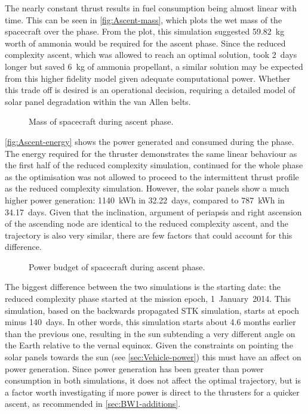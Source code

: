 The nearly constant thrust results in fuel consumption being almost linear with time. This can be seen in \autoref{fig:Ascent-mass}, which plots the wet mass of the spacecraft over the phase. From the plot, this simulation suggested 59.82~kg worth of ammonia would be required for the ascent phase. %
Since the reduced complexity ascent, which was allowed to reach an optimal solution, took 2~days longer but saved 6~kg of ammonia propellant, a similar solution may be expected from this higher fidelity model given adequate computational power. Whether this trade off is desired is an operational decision, requiring a detailed model of solar panel degradation within the van Allen belts.

\begin{figure}
\caption{Mass of spacecraft during ascent phase.} \label{fig:Ascent-mass}
\centering
\def\svgwidth{\figurewidth}

\end{figure}

\autoref{fig:Ascent-energy} shows the power generated and consumed during the phase. The energy required for the thruster demonstrates the same linear behaviour as the first half of the reduced complexity simulation, continued for the whole phase as the optimisation was not allowed to proceed to the intermittent thrust profile as the reduced complexity simulation. However, the solar panels show a much higher power generation: 1140~kWh in 32.22~days, compared to 787~kWh in 34.17~days. Given that the inclination, argument of periapsis and right ascension of the ascending node are identical to the reduced complexity ascent, and the trajectory is also very similar, there are few factors that could account for this difference. 

\begin{figure}
\caption{Power budget of spacecraft during ascent phase.} \label{fig:Ascent-energy}
\centering
\def\svgwidth{\figurewidth}

\end{figure}

The biggest difference between the two simulations is the starting date: the reduced complexity phase started at the mission epoch, 1~January~2014. This simulation, based on the backwards propagated STK simulation, starts at epoch minus 140~days. In other words, this simulation starts about 4.6 months earlier than the previous one, resulting in the sun subtending a very different angle on the Earth relative to the vernal equinox. Given the constraints on pointing the solar panels towards the sun (see \autoref{sec:Vehicle-power}) this must have an affect on power generation. Since power generation has been greater than power consumption in both simulations, it does not affect the optimal trajectory, but is a factor worth investigating if more power is direct to the thrusters for a quicker ascent, as recommended in \autoref{sec:BW1-additions}.

